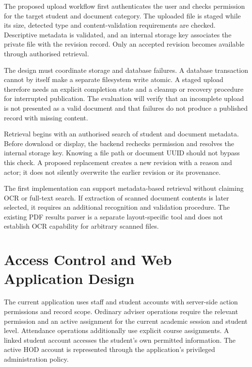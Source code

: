 The proposed upload workflow first authenticates the user and checks permission for the target student and document category. The uploaded file is staged while its size, detected type and content-validation requirements are checked. Descriptive metadata is validated, and an internal storage key associates the private file with the revision record. Only an accepted revision becomes available through authorised retrieval.

The design must coordinate storage and database failures. A database transaction cannot by itself make a separate filesystem write atomic. A staged upload therefore needs an explicit completion state and a cleanup or recovery procedure for interrupted publication. The evaluation will verify that an incomplete upload is not presented as a valid document and that failures do not produce a published record with missing content.

Retrieval begins with an authorised search of student and document metadata. Before download or display, the backend rechecks permission and resolves the internal storage key. Knowing a file path or document UUID should not bypass this check. A proposed replacement creates a new revision with a reason and actor; it does not silently overwrite the earlier revision or its provenance.

The first implementation can support metadata-based retrieval without claiming OCR or full-text search. If extraction of scanned document contents is later selected, it requires an additional recognition and validation procedure. The existing PDF results parser is a separate layout-specific tool and does not establish OCR capability for arbitrary scanned files.

\section{Access Control and Web Application Design}\label{sec:3-6}

The current application uses staff and student accounts with server-side action permissions and record scope. Ordinary adviser operations require the relevant permission and an active assignment for the current academic session and student level. Attendance operations additionally use explicit course assignments. A linked student account accesses the student's own permitted information. The active HOD account is represented through the application's privileged administration policy.




